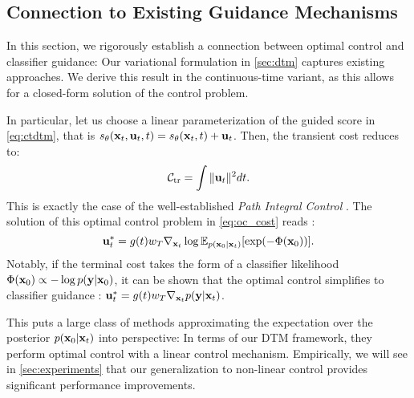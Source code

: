 \subsection{Connection to Existing Guidance Mechanisms}
\label{sec:classifier-guidance}

In this section, we rigorously establish a connection between optimal control and classifier guidance: Our variational formulation in \cref{sec:dtm} captures existing approaches. We derive this result in the continuous-time variant, as this allows for a closed-form solution of the control problem.

In particular, let us choose a linear parameterization of the guided score in \cref{eq:ctdtm}, that is $s_\theta({\mathbf{x}}_t, {\mathbf{u}}_t, t) = s_\theta({\mathbf{x}}_t, t) + {\mathbf{u}}_t$. Then, the transient cost reduces to:
\begin{equation}
    {\mathcal{C}}_\text{tr} = \int \|{\mathbf{u}}_t\|^2 dt.
\end{equation}
This is exactly the case of the well-established \textit{Path Integral Control} \cite{Kappen_2005,kappen2008stochastic}. The solution of this optimal control problem in \cref{eq:oc_cost} reads \citep[Eq.~(34)]{kappen2008stochastic}:
\begin{equation}
    {\mathbf{u}}_t^* = g(t) w_T \nabla_{{\mathbf{x}}_t} \log \mathbb{E}_{p({\mathbf{x}}_0|{\mathbf{x}}_t)}[\exp(-\Phi({\mathbf{x}}_0))].
\end{equation}
Notably, if the terminal cost takes the form of a classifier likelihood $\Phi({\mathbf{x}}_0) \propto -\log p({\mathbf{y}}|{\mathbf{x}}_0)$, it can be shown \cite{HuangGLHZSGOY24} that the optimal control simplifies to classifier guidance  \cite{dhariwal2021diffusion}: $ {\mathbf{u}}_t^* = g(t) w_T \nabla_{{\mathbf{x}}_t} p({\mathbf{y}}|{\mathbf{x}}_t) $. 

This puts a large class of methods approximating the expectation over the posterior $p({\mathbf{x}}_0|{\mathbf{x}}_t)$ \citep{chung2022diffusion, song2022pseudoinverse, pandey2024fast, HuangGLHZSGOY24} into perspective: In terms of our DTM framework, they perform optimal control with a linear control mechanism. Empirically, we will see in \cref{sec:experiments} that our generalization to non-linear control provides significant performance improvements.














